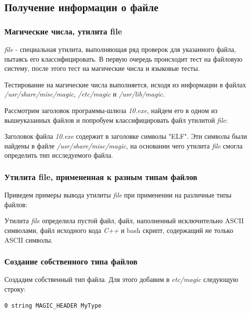 \documentclass[14pt,a4paper,report]{report}
\begin{document}
\subsection{Получение информации о файле}

\subsubsection{Магические числа, утилита file}

\emph{file} - специальная утилита, выполняющая ряд проверок для указанного файла, пытаясь его классифицировать. В первую очередь происходит тест на файловую систему, после этого тест на магические числа и языковые тесты.

Тестирование на магические числа выполняется, исходя из информации в файлах \emph{/usr/share/misc/magic}, \emph{/etc/magic} и \emph{/usr/lib/magic}.

Рассмотрим заголовок программы-шлюза \emph{10.exe}, найдем его в одном из вышеуказанных файлов и попробуем классифицировать файл утилитой \emph{file}:



Заголовок файла \emph{10.exe} содержит в заголовке символы "ELF". Эти символы были найдены в файле \emph{/usr/share/misc/magic}, на основании чего утилита \emph{file} смогла определить тип исследуемого файла.

\subsubsection{Утилита file, примененная к разным типам файлов}

Приведем примеры вывода утилиты \emph{file} при применении на различные типы файлов:



Утилита \emph{file} определила пустой файл, файл, наполненный исключительно ASCII символами, файл исходного кода \emph{C++} и bash скрипт, содержащий не только ASCII символы.

\subsubsection{Создание собственного типа файлов}

Создадим собственный тип файла. Для этого добавим в \emph{etc/magic} следующую строку:

\begin{verbatim}
0 string MAGIC_HEADER MyType
\end{verbatim}
\end{document}
